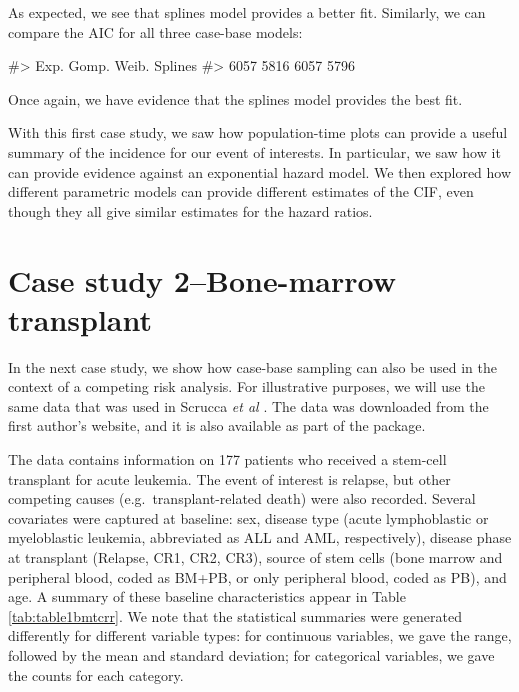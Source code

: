 \documentclass[
]{jss}
\begin{document}
As expected, we see that splines model provides a better fit. Similarly,
we can compare the AIC for all three case-base models:

\begin{CodeChunk}

\begin{CodeOutput}
#>    Exp.   Gomp.   Weib. Splines 
#>    6057    5816    6057    5796
\end{CodeOutput}
\end{CodeChunk}

Once again, we have evidence that the splines model provides the best
fit.

With this first case study, we saw how population-time plots can provide
a useful summary of the incidence for our event of interests. In
particular, we saw how it can provide evidence against an exponential
hazard model. We then explored how different parametric models can
provide different estimates of the CIF, even though they all give
similar estimates for the hazard ratios.

\hypertarget{case-study-2bone-marrow-transplant}{%
\section{Case study 2--Bone-marrow
transplant}\label{case-study-2bone-marrow-transplant}}

In the next case study, we show how case-base sampling can also be used
in the context of a competing risk analysis. For illustrative purposes,
we will use the same data that was used in Scrucca \emph{et al}
\citeyearpar{scrucca2010regression}. The data was downloaded from the
first author's website, and it is also available as part of the
 package.

The data contains information on 177 patients who received a stem-cell
transplant for acute leukemia. The event of interest is relapse, but
other competing causes (e.g.~transplant-related death) were also
recorded. Several covariates were captured at baseline: sex, disease
type (acute lymphoblastic or myeloblastic leukemia, abbreviated as ALL
and AML, respectively), disease phase at transplant (Relapse, CR1, CR2,
CR3), source of stem cells (bone marrow and peripheral blood, coded as
BM+PB, or only peripheral blood, coded as PB), and age. A summary of
these baseline characteristics appear in Table \ref{tab:table1bmtcrr}.
We note that the statistical summaries were generated differently for
different variable types: for continuous variables, we gave the range,
followed by the mean and standard deviation; for categorical variables,
we gave the counts for each category.
\end{document}

